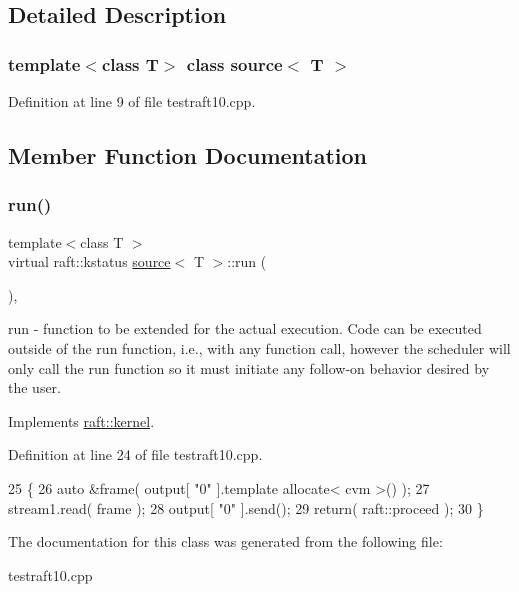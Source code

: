 \subsection{Detailed Description}
\subsubsection*{template$<$class T$>$\newline
class source$<$ T $>$}



Definition at line 9 of file testraft10.\+cpp.



\subsection{Member Function Documentation}
\hypertarget{classsource_ad144988607882cbe591a4c71642cb77a}{}\label{classsource_ad144988607882cbe591a4c71642cb77a} 
\subsubsection{\texorpdfstring{run()}{run()}}
{\footnotesize\ttfamily template$<$class T $>$ \\
virtual raft\+::kstatus \hyperlink{classsource}{source}$<$ T $>$\+::run (\begin{DoxyParamCaption}{ }\end{DoxyParamCaption})\hspace{0.3cm}{\ttfamily [inline]}, {\ttfamily [virtual]}}

run -\/ function to be extended for the actual execution. Code can be executed outside of the run function, i.\+e., with any function call, however the scheduler will only call the run function so it must initiate any follow-\/on behavior desired by the user. 

Implements \hyperlink{classraft_1_1kernel_a05094286d7577360fb1b91c91fc05901}{raft\+::kernel}.



Definition at line 24 of file testraft10.\+cpp.


\begin{DoxyCode}
25    \{
26       \textcolor{keyword}{auto} &frame( output[ \textcolor{stringliteral}{"0"} ].\textcolor{keyword}{template} allocate< cvm >() );
27       stream1.read( frame );
28       output[ \textcolor{stringliteral}{"0"} ].send();
29       \textcolor{keywordflow}{return}( raft::proceed );
30    \}
\end{DoxyCode}


The documentation for this class was generated from the following file\+:\begin{DoxyCompactItemize}
\item 
testraft10.\+cpp\end{DoxyCompactItemize}
